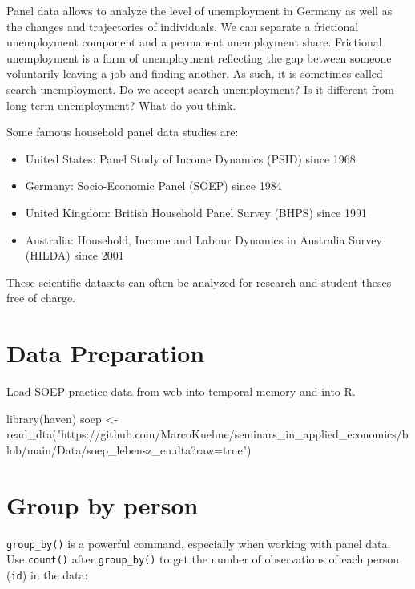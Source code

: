 \documentclass[
]{book}
\newenvironment{Shaded}{\begin{snugshade}}{\end{snugshade}}
\newcommand{\FunctionTok}[1]{\textcolor[rgb]{0.00,0.00,0.00}{#1}}
\newcommand{\NormalTok}[1]{#1}
\newcommand{\OtherTok}[1]{\textcolor[rgb]{0.56,0.35,0.01}{#1}}
\newcommand{\StringTok}[1]{\textcolor[rgb]{0.31,0.60,0.02}{#1}}
\providecommand{\tightlist}{%
  \setlength{\itemsep}{0pt}\setlength{\parskip}{0pt}}
\begin{document}
Panel data allows to analyze the level of unemployment in Germany as well as the changes and trajectories of individuals. We can separate a frictional unemployment component and a permanent unemployment share. Frictional unemployment is a form of unemployment reflecting the gap between someone voluntarily leaving a job and finding another. As such, it is sometimes called search unemployment. Do we accept search unemployment? Is it different from long-term unemployment? What do you think.

Some famous household panel data studies are:

\begin{itemize}
\tightlist
\item
  United States: Panel Study of Income Dynamics (PSID) since 1968
\item
  Germany: Socio-Economic Panel (SOEP) since 1984
\item
  United Kingdom: British Household Panel Survey (BHPS) since 1991
\item
  Australia: Household, Income and Labour Dynamics in Australia Survey (HILDA) since 2001
\end{itemize}

These scientific datasets can often be analyzed for research and student theses free of charge.

\hypertarget{data-preparation-1}{%
\section{Data Preparation}\label{data-preparation-1}}

Load SOEP practice data from web into temporal memory and into R.

\begin{Shaded}
\begin{Highlighting}[]
\FunctionTok{library}\NormalTok{(haven)}
\NormalTok{soep }\OtherTok{\textless{}{-}} \FunctionTok{read\_dta}\NormalTok{(}\StringTok{"https://github.com/MarcoKuehne/seminars\_in\_applied\_economics/blob/main/Data/soep\_lebensz\_en.dta?raw=true"}\NormalTok{)}
\end{Highlighting}
\end{Shaded}

\hypertarget{group-by-person}{%
\section{Group by person}\label{group-by-person}}

\texttt{group\_by()} is a powerful command, especially when working with panel data. Use \texttt{count()} after \texttt{group\_by()} to get the number of observations of each person (\texttt{id}) in the data:
\end{document}
